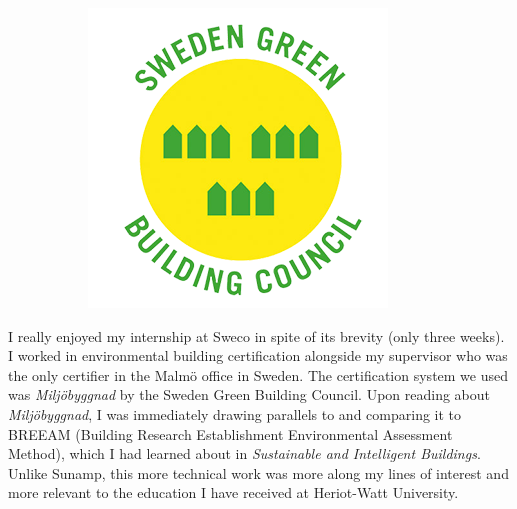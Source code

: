 \begin{figure}
\begin{subfigure}{0.2\textwidth}
		\centering
		\includegraphics[width=\textwidth]{figures/sgbc.png}
	\end{subfigure}
	\label{fig:mb}
\end{figure}


I really enjoyed my internship at Sweco in spite of its brevity (only three weeks).
I worked in environmental building certification alongside my supervisor who was the only certifier in the Malm\"o office in Sweden.
The certification system we used was \textit{Milj\"obyggnad} by the Sweden Green Building Council.
Upon reading about \textit{Milj\"obyggnad}, I was immediately drawing parallels to and comparing it to BREEAM (Building Research Establishment Environmental Assessment Method), which I had learned about in \textit{Sustainable and Intelligent Buildings}.
Unlike Sunamp, this more technical work was more along my lines of interest and more relevant to the education I have received at Heriot-Watt University.

